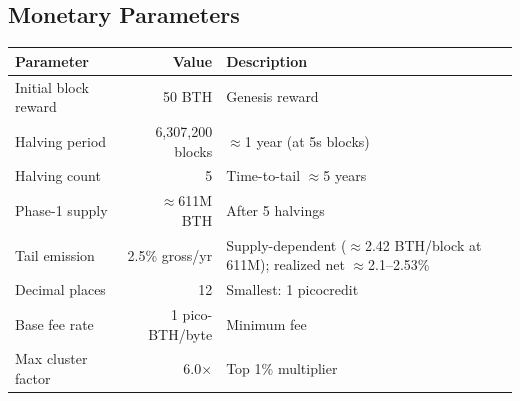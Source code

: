 \subsection{Monetary Parameters}

\begin{tabular}{@{}lrl@{}}
\toprule
\textbf{Parameter} & \textbf{Value} & \textbf{Description} \\
\midrule
Initial block reward & 50 BTH & Genesis reward \\
Halving period & 6,307,200 blocks & $\approx$1 year (at 5s blocks) \\
Halving count & 5 & Time-to-tail $\approx$5 years \\
Phase-1 supply & $\approx$611M BTH & After 5 halvings \\
Tail emission & 2.5\% gross/yr & Supply-dependent ($\approx$2.42 BTH/block at 611M); realized net $\approx$2.1--2.53\% \\
Decimal places & 12 & Smallest: 1 picocredit \\
Base fee rate & 1 pico-BTH/byte & Minimum fee \\
Max cluster factor & 6.0$\times$ & Top 1\% multiplier \\
\bottomrule
\end{tabular}


